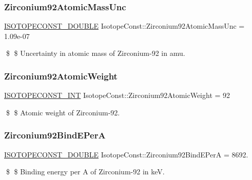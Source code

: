 \subsubsection{\texorpdfstring{Zirconium92\+Atomic\+Mass\+Unc}{Zirconium92AtomicMassUnc}}
{\footnotesize\ttfamily \mbox{\hyperlink{group___isotope_const-_macros_ga8f45a7272ce02c0b4c65c44636ed719a}{I\+S\+O\+T\+O\+P\+E\+C\+O\+N\+S\+T\+\_\+\+D\+O\+U\+B\+LE}} Isotope\+Const\+::\+Zirconium92\+Atomic\+Mass\+Unc = 1.\+09e-\/07}

\$ \$ Uncertainty in atomic mass of Zirconium-\/92 in amu. \mbox{\label{group___isotope_const-_zirconium-_zr92_ga071c0f33dab602b2d8fbc5a9b842d9d8}} 
\subsubsection{\texorpdfstring{Zirconium92\+Atomic\+Weight}{Zirconium92AtomicWeight}}
{\footnotesize\ttfamily \mbox{\hyperlink{group___isotope_const-_macros_ga5f18360b3e99483a35c32d789e62621c}{I\+S\+O\+T\+O\+P\+E\+C\+O\+N\+S\+T\+\_\+\+I\+NT}} Isotope\+Const\+::\+Zirconium92\+Atomic\+Weight = 92}

\$ \$ Atomic weight of Zirconium-\/92. \mbox{\label{group___isotope_const-_zirconium-_zr92_gabf10cbb9b9a0ac76aa3d351caaadbdf4}} 
\subsubsection{\texorpdfstring{Zirconium92\+Bind\+E\+PerA}{Zirconium92BindEPerA}}
{\footnotesize\ttfamily \mbox{\hyperlink{group___isotope_const-_macros_ga8f45a7272ce02c0b4c65c44636ed719a}{I\+S\+O\+T\+O\+P\+E\+C\+O\+N\+S\+T\+\_\+\+D\+O\+U\+B\+LE}} Isotope\+Const\+::\+Zirconium92\+Bind\+E\+PerA = 8692.}

\$ \$ Binding energy per A of Zirconium-\/92 in keV. \mbox{\label{group___isotope_const-_zirconium-_zr92_ga46fef60e2a42471ef08efbd62eb1245a}} 
